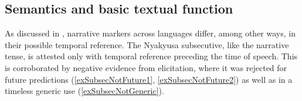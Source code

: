 \subsection{Semantics and basic textual function}\label{SubsecutiveSemantics}
As discussed in , narrative markers across languages differ, among other ways, in their possible temporal reference. The Nyakyusa subsecutive, like the narrative tense, is attested only with temporal reference preceding the time of speech. This is corroborated by negative evidence from elicitation, where it was rejected for future predictions (\ref{exSubsecNotFuture1}, \ref{exSubsecNotFuture2}) as well as in a timeless generic use (\ref{exSubsecNotGeneric}).
\begin{exe}



\end{exe}
